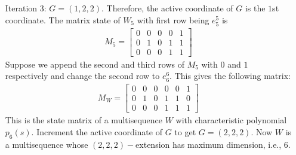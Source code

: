 \documentclass[letterpaper, 12 pt]{article}  \usepackage{amssymb}
\begin{document}
\begin{enumerate}
 \item[Iteration 3:] $G = (1,2,2)$. Therefore, the active coordinate of $G$ is
the $1$st coordinate. The matrix state of $W_5$ with first row being $e_5^5$
is 
\begin{eqnarray*}
 M_5 =  \left[\begin{matrix}
  0 & 0 & 0 & 0& 1\\
  0 & 1 & 0 & 1 & 1\\
  0 & 0 & 0 & 1 & 1 
 \end{matrix}
\right]
\end{eqnarray*}
Suppose we append the second and third rows of $M_5$ with $0$ and $1$ respectively and
change the second row to $e_6^6$. This gives the following matrix:
 \begin{eqnarray*}
 M_W =  \left[\begin{matrix}
  0 & 0 & 0 & 0 & 0 & 1\\
  0 & 1 & 0 & 1 & 1 & 0\\
  0 & 0 & 0 & 1 & 1 & 1
 \end{matrix}
\right]
\end{eqnarray*}
 This is the state matrix of a multisequence $W$ with characteristic
polynomial $p_6(s)$. Increment the active coordinate of $G$ to get $G =
(2,2,2)$. Now $W$ is a multisequence whose $(2,2,2)-$extension has maximum
dimension, i.e., $6$.
\end{enumerate}
\end{document}
